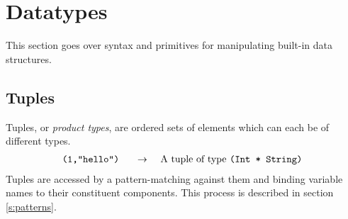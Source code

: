 \documentclass[twocolumn]{report}
\newcommand{\evalsto}[2]{\[ \begin{array}{rcl}
$\tt #1 $&$ \arr $&$ #2 $
\end{array} \]}
\newcommand{\arr}{\ensuremath{\rightarrow}}
\newenvironment{wscode}{\begin{center}\tt}{\end{center}}
\begin{document}














\section{Datatypes}

This section goes over syntax and primitives for manipulating
built-in data structures.

\subsection{Tuples}

Tuples, or {\em product types}, are ordered sets of elements which can
each be of different types. 
\evalsto{(1,``hello'')}{A tuple of type {\tt (Int * String)}}
Tuples are accessed by a pattern-matching against them and binding
variable names to their constituent components.  This process is
described in section \ref{s:patterns}.
\end{document}

